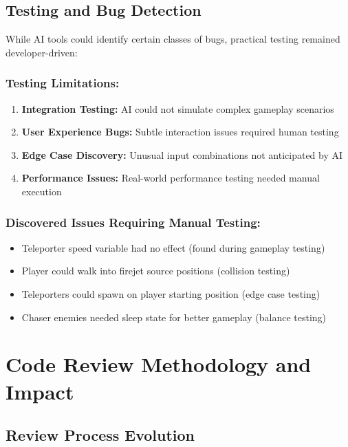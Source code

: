 \documentclass[12pt,a4paper]{article}
\begin{document}
\subsection{Testing and Bug Detection}

While AI tools could identify certain classes of bugs, practical testing remained developer-driven:

\subsubsection*{Testing Limitations:}
\begin{enumerate}
    \item \textbf{Integration Testing:} AI could not simulate complex gameplay scenarios
    \item \textbf{User Experience Bugs:} Subtle interaction issues required human testing
    \item \textbf{Edge Case Discovery:} Unusual input combinations not anticipated by AI
    \item \textbf{Performance Issues:} Real-world performance testing needed manual execution
\end{enumerate}

\subsubsection*{Discovered Issues Requiring Manual Testing:}
\begin{itemize}
    \item Teleporter speed variable had no effect (found during gameplay testing)
    \item Player could walk into firejet source positions (collision testing)
    \item Teleporters could spawn on player starting position (edge case testing)
    \item Chaser enemies needed sleep state for better gameplay (balance testing)
\end{itemize}

\newpage

\section{Code Review Methodology and Impact}

\subsection{Review Process Evolution}
\end{document}
